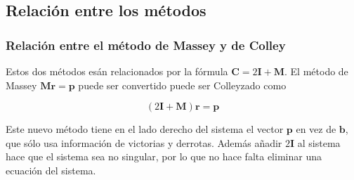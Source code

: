 \subsection{Relación entre los métodos}

\subsubsection{Relación entre el método de Massey y de Colley}

Estos dos métodos esán relacionados por la fórmula $\mathbf{C} = 2\mathbf{I} + \mathbf{M}$. El método de Massey $\mathbf{M r} = \mathbf{p}$ puede ser convertido puede ser Colleyzado como

\[ (2\mathbf{I} + \mathbf{M})\mathbf{r} = \mathbf{p} \]

Este nuevo método tiene en el lado derecho del sistema el vector $\mathbf{p}$ en vez de $\mathbf{b}$, que sólo usa información de victorias y derrotas. Además añadir $2\mathbf{I}$ al sistema hace que el sistema sea no singular, por lo que no hace falta eliminar una ecuación del sistema.

